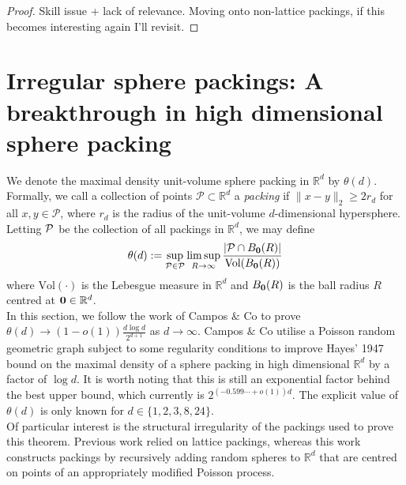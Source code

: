 \documentclass{article}
\newcounter{definitioncount} %
\newcounter{lemmacount}
\newcounter{examplecount}
\newcounter{theoremcount}
\newcounter{propositioncount}
\newcounter{corollarycount}
\newcounter{remarkcount}
\begin{document}
\begin{proof}
    Skill issue + lack of relevance. Moving onto non-lattice packings, if this becomes interesting again I'll revisit.
\end{proof}

\newpage

\section{Irregular sphere packings: A breakthrough in high dimensional sphere packing}

\setcounter{lemmacount}{1}
\setcounter{examplecount}{1}
\setcounter{theoremcount}{1}
\setcounter{propositioncount}{1}
\setcounter{corollarycount}{1}
\setcounter{remarkcount}{1}
\setcounter{definitioncount}{1}

We denote the maximal density unit-volume sphere packing in $\mathbb{R}^d$ by $\theta(d)$. Formally, we call 
a collection of points $\mathcal{P} \subset \mathbb{R}^d$ a {\it packing} if $\lVert x - y \rVert_2 \geq 2r_d$ for 
all $x,y \in \mathcal{P}$, where $r_d$ is the radius of the unit-volume $d$-dimensional hypersphere. Letting 
${\bf \mathcal{P}}$ be the collection of all packings in $\mathbb{R}^d$, we may define 
\[\theta(d) := \sup_{\mathcal{P} \in {\bf \mathcal{P}}} \limsup_{R \to \infty}
\frac{|\mathcal{P} \cap B_{{\bf 0}}(R)|}{\text{Vol}(B_{{\bf 0}}(R))}\]
where $\text{Vol}(\cdot)$ is the Lebesgue measure in $\mathbb{R}^d$ and $B_{\bf 0}(R)$ is the ball radius $R$ centred at 
${\bf 0} \in \mathbb{R}^d$. \\

In this section, we follow the work of Campos $\&$ Co to prove $\theta(d) \to (1 - o(1))\frac{d\log d}{2^{d+1}}$ as 
$d \to \infty$. Campos $\&$ Co utilise a Poisson random geometric graph subject to some regularity conditions 
to improve Hayes' 1947 bound on the maximal density of a sphere packing in high dimensional $\mathbb{R}^d$ 
by a factor of $\log d$. It is worth noting that this is still an exponential factor behind the best upper bound, 
which currently is $2^{(-0.599\cdots + o(1))d}$. The explicit value of $\theta(d)$ is only known for 
$d \in \{1,2,3,8,24\}$. \\ 

Of particular interest is the structural irregularity of the packings used to prove this theorem. Previous work 
relied on lattice packings, whereas this work constructs packings by recursively adding random spheres to $\mathbb{R}^d$
that are centred on points of an appropriately modified Poisson process. \\
\end{document}
